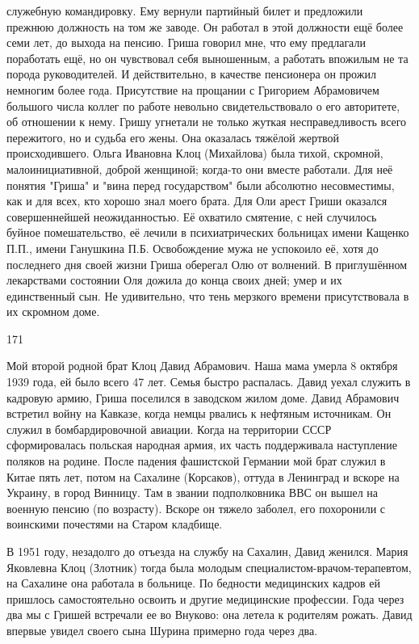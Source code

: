 служебную командировку. Ему вернули партийный билет и предложили прежнюю должность на том же заводе. Он работал в этой должности ещё более семи лет, до выхода на пенсию. Гриша говорил мне, что ему предлагали поработать ещё, но он чувствовал себя выношенным, а работать впожилым не та порода руководителей. И действительно, в качестве пенсионера он прожил немногим более года. Присутствие на прощании с Григорием Абрамовичем большого числа коллег по работе невольно свидетельствовало о его авторитете, об отношении к нему. Гришу угнетали не только жуткая несправедливость всего пережитого, но и судьба его жены. Она оказалась тяжёлой жертвой происходившего. Ольга Ивановна Клоц (Михайлова) была тихой, скромной, малоинициативной, доброй женщиной; когда-то они вместе работали. Для неё понятия "Гриша" и "вина перед государством" были абсолютно несовместимы, как и для всех, кто хорошо знал моего брата. Для Оли арест Гриши оказался совершеннейшей неожиданностью. Её охватило смятение, с ней случилось буйное помешательство, её лечили в психиатрических больницах имени Кащенко П.П., имени Ганушкина П.Б. Освобождение мужа не успокоило её, хотя до последнего дня своей жизни Гриша оберегал Олю от волнений. В приглушённом лекарствами состоянии Оля дожила до конца своих дней; умер и их единственный сын. Не удивительно, что тень мерзкого времени присутствовала в их скромном доме.

171

Мой второй родной брат Клоц Давид Абрамович. Наша мама умерла 8 октября 1939 года, ей было всего 47 лет. Семья быстро распалась. Давид уехал служить в кадровую армию, Гриша поселился в заводском жилом доме. Давид Абрамович встретил войну на Кавказе, когда немцы рвались к нефтяным источникам. Он служил в бомбардировочной авиации. Когда на территории СССР сформировалась польская народная армия, их часть поддерживала наступление поляков на родине. После падения фашистской Германии мой брат служил в Китае пять лет, потом на Сахалине (Корсаков), оттуда в Ленинград и вскоре на Украину, в город Винницу. Там в звании подполковника ВВС он вышел на военную пенсию (по возрасту). Вскоре он тяжело заболел, его похоронили с воинскими почестями на Старом кладбище.

В 1951 году, незадолго до отъезда на службу на Сахалин, Давид женился. Мария Яковлевна Клоц (Злотник) тогда была молодым специалистом-врачом-терапевтом, на Сахалине она работала в больнице. По бедности медицинских кадров ей пришлось самостоятельно освоить и другие медицинские профессии. Года через два мы с Гришей встречали ее во Внуково: она летела к родителям рожать. Давид впервые увидел своего сына Шурина примерно года через два.

